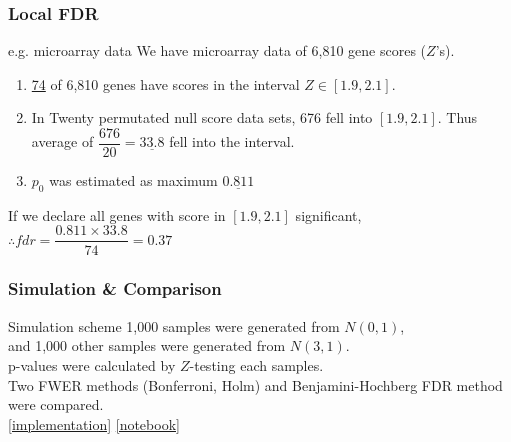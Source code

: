 \documentclass{beamer}
\begin{document}
\frame
{
    \frametitle{Local FDR}
    \begin{block}{e.g. microarray data}
    We have microarray data of 6,810 gene scores ($Z$'s). \vspace{0.15in}\\
    
    \begin{enumerate}[-]
      \item \underline{74} of 6,810 genes have scores in the interval $Z \in [1.9, 2.1]$.\\
      \item In Twenty permutated null score data sets, 676 fell into $[1.9, 2.1]$. Thus average of $\dfrac{676}{20}=\underline{33.8}$ fell into the interval.\\
      \item $p_0$ was estimated as maximum $\underline{0.811}$ \vspace{0.15in}\\
    \end{enumerate}
    
    If we declare all genes with score in $[1.9, 2.1]$ significant, $\therefore fdr=\dfrac{0.811 \times 33.8}{74}=0.37$
    
    \end{block}
}


\frame
{
    \frametitle{\LARGE Simulation \& Comparison}
    \normalsize
    \begin{block}{Simulation scheme}
    1,000 samples were generated from $N(0, 1)$, \\and 1,000 other samples were generated from $N(3, 1)$\vspace{0.12in}.\\
    
    p-values were calculated by $Z$-testing each samples. \vspace{0.2in}\\
    
    Two FWER methods (Bonferroni, Holm) and Benjamini-Hochberg FDR method were compared.\vspace{0.05in}\\
    \href{https://gist.github.com/naturale0/3915e2def589553e91dce99e69d138cc\#file-mcpconverter-py}{[implementation]} 
     \href{https://gist.github.com/naturale0/3915e2def589553e91dce99e69d138cc\#file-mcp_simulation-ipynb}{[notebook]}
    
    \end{block}
}
\end{document}
